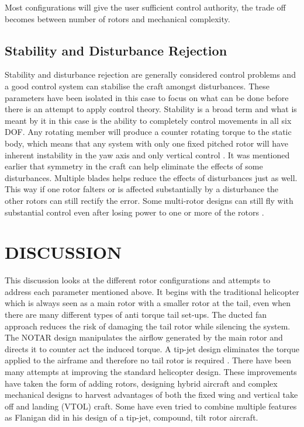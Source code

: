 \documentclass[a4paper, 10pt, conference]{ieeeconf}
\begin{document}
Most configurations will give the user sufficient control authority, the trade off becomes between number of rotors and mechanical complexity.


\subsection{Stability and Disturbance Rejection}
Stability and disturbance rejection are generally considered control problems and a good control system can stabilise the craft amongst disturbances. These parameters have been isolated in this case to focus on what can be done before there is an attempt to apply control theory. 
Stability is a broad term and what is meant by it in this case is the ability to completely control movements in all six DOF. Any rotating member will produce a counter rotating torque to the static body, which means that any system with only one fixed pitched rotor will have inherent instability in the yaw axis and only vertical control \cite{MiniFlying}. 
It was mentioned earlier that symmetry in the craft can help eliminate the effects of some disturbances. Multiple blades helps reduce the effects of disturbances just as well. This way if one rotor falters or is affected substantially by a disturbance the other rotors can still rectify the error. Some multi-rotor designs can still fly with substantial control even after losing power to one or more of the rotors \cite{RotorLoss}. 


\section{DISCUSSION}
This discussion looks at the different rotor configurations and attempts to address each parameter mentioned above. It begins with the traditional helicopter which is always seen as a main rotor with a smaller rotor at the tail, even when there are many different types of anti torque tail set-ups. The ducted fan approach reduces the risk of damaging the tail rotor while silencing the system. The NOTAR design \cite{US4200252} manipulates the airflow generated by the main rotor and directs it to counter act the induced torque. A tip-jet design eliminates the torque applied to the airframe and therefore no tail rotor is required \cite{RotorConfig}. There have been many attempts at improving the standard helicopter design. These improvements have taken the form of adding rotors, designing hybrid aircraft and complex mechanical designs to harvest advantages of both the fixed wing and vertical take off and landing (VTOL) craft. Some have even tried to combine multiple features as Flanigan \cite{US7147182} did in his design of a tip-jet, compound, tilt rotor aircraft. 
\end{document}
